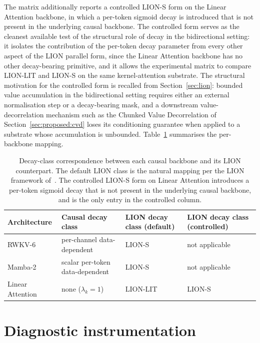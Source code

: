 The matrix additionally reports a controlled LION-S form on the
Linear Attention backbone, in which a per-token sigmoid decay is
introduced that is not present in the underlying causal backbone.
The controlled form serves as the cleanest available test of the
structural role of decay in the bidirectional setting: it
isolates the contribution of the per-token decay parameter from
every other aspect of the LION parallel form, since the Linear
Attention backbone has no other decay-bearing primitive, and it
allows the experimental matrix to compare LION-LIT and LION-S on
the same kernel-attention substrate. The structural motivation
for the controlled form is recalled from Section~\ref{sec:lion}:
bounded value accumulation in the bidirectional setting requires
either an external normalisation step or a decay-bearing mask,
and a downstream value-decorrelation mechanism such as the
Chunked Value Decorrelation of Section~\ref{sec:proposed:cvd}
loses its conditioning guarantee when applied to a substrate
whose accumulation is unbounded.
Table~\ref{tab:lion-mapping} summarises the per-backbone mapping.

\begin{table}[t]
\centering
\small
\caption[LION decay-class mapping per backbone]{Decay-class
correspondence between each causal backbone and its LION
counterpart. The default LION class is the natural mapping per the
LION framework of~\citet{afzal2025linear}. The controlled LION-S
form on Linear Attention introduces a per-token sigmoid decay
that is not present in the underlying causal backbone, and is
the only entry in the controlled column.}
\label{tab:lion-mapping}
\setlength{\tabcolsep}{4pt}
\renewcommand{\arraystretch}{1.25}
\begin{tabularx}{\linewidth}{@{}p{2.6cm} X X X@{}}
\toprule
\textbf{Architecture} & \textbf{Causal decay class} & \textbf{LION decay class (default)} & \textbf{LION decay class (controlled)} \\
\midrule
RWKV-6 & per-channel data-dependent & LION-S & not applicable \\
\addlinespace
Mamba-2 & scalar per-token data-dependent & LION-S & not applicable \\
\addlinespace
Linear Attention & none ($\lambda_{k} = 1$) & LION-LIT & LION-S \\
\bottomrule
\end{tabularx}
\end{table}

\section{Diagnostic instrumentation}\label{sec:proposed:probes}


